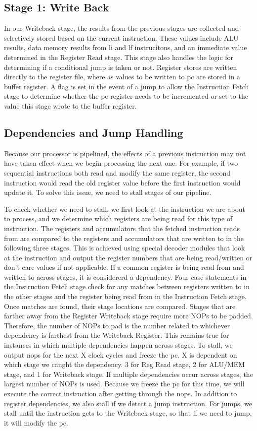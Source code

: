 \documentclass[sigconf]{acmart}
\begin{document}
\subsection{Stage 1: Write Back}
In our Writeback stage, the results from the previous stages are collected and selectively stored based on the current instruction. These values include ALU results, data memory results from li and lf instrucitons, and an immediate value determined in the Register Read stage. This stage also handles the logic for determining if a conditional jump is taken or not. Register stores are written directly to the register file, where as values to be written to pc are stored in a buffer register. A flag is set in the event of a jump to allow the Instruction Fetch stage to determine whether the pc register needs to be incremented or set to the value this stage wrote to the buffer register. 

\subsection{Dependencies and Jump Handling}
Because our processor is pipelined, the effects of a previous instruction may not have taken effect when we begin processing the next one. For example, if two sequential instructions both read and modify the same register, the second instruction would read the old register value before the first instruction would update it. To solve this issue, we need to stall stages of our pipeline.

To check whether we need to stall, we first look at the instruction we are about to process, and we determine which registers are being read for this type of instruction. The registers and accumulators that the fetched instruction reads from are compared to the registers and accumulators that are written to in the following three stages. This is achieved using special decoder modules that look at the instruction and output the register numbers that are being read/written or don't care values if not applicable. If a common register is being read from and written to across stages, it is considererd a dependency. Four case statements in the Instruction Fetch stage check for any matches between registers written to in the other stages and the register being read from in the Instruction Fetch stage. Once matches are found, their stage locations are compared. Stages that are farther away from the Register Writeback stage require more NOPs to be padded. Therefore, the number of NOPs to pad is the number related to whichever dependency is farthest from the Writeback Register. This remains true for instances in which multiple dependencies happen across stages. To stall, we output nops for the next X clock cycles and freeze the pc. X is dependent on which stage we caught the dependency. 3 for Reg Read stage, 2 for ALU/MEM stage, and 1 for Writeback stage. If multiple dependencies occur across stages, the largest number of NOPs is used. Because we freeze the pc for this time, we will execute the correct instruction after getting through the nops. In addition to register dependencies, we also stall if we detect a jump instruction. For jumps, we stall until the instruction gets to the Writeback stage, so that if we need to jump, it will modify the pc. 
\end{document}
